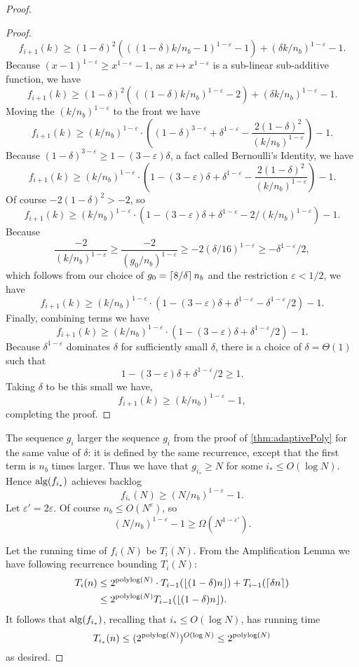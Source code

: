 \begin{proof}
\begin{proof}
  $$f_{i+1}(k) \ge (1-\delta)^2 (((1-\delta)k/n_b-1)^{1-\varepsilon}-1) + (\delta k/n_b)^{1-\varepsilon} - 1.$$
  Because $(x-1)^{1-\varepsilon} \ge x^{1-\varepsilon} -1$, as $x\mapsto x^{1-\varepsilon}$ is a sub-linear
  sub-additive function, we have 
  $$f_{i+1}(k) \ge (1-\delta)^2 (((1-\delta)k/n_b)^{1-\varepsilon}-2) + (\delta k/n_b)^{1-\varepsilon}-1.$$
  Moving the $(k/n_b)^{1-\varepsilon}$ to the front we have
  $$ f_{i+1}(k) \ge (k/n_b)^{1-\varepsilon} \cdot\left((1-\delta)^{3-\varepsilon} + \delta^{1-\varepsilon} - \frac{2(1-\delta)^2}{(k/n_b)^{1-\varepsilon}} \right) -1.$$
  Because $(1-\delta)^{3-\varepsilon} \ge 1-(3-\varepsilon)\delta$, a fact called Bernoulli's Identity, we have
  $$f_{i+1}(k) \ge (k/n_b)^{1-\varepsilon} \cdot\left(1-(3-\varepsilon)\delta + \delta^{1-\varepsilon} - \frac{2(1-\delta)^2}{(k/n_b)^{1-\varepsilon}} \right)-1.$$
  Of course $-2(1-\delta)^2 > -2$, so 
  $$f_{i+1}(k) \ge (k/n_b)^{1-\varepsilon} \cdot\left(1-(3-\varepsilon)\delta + \delta^{1-\varepsilon} - 2/(k/n_b)^{1-\varepsilon} \right) -1.$$
  Because $$\frac{-2}{(k/n_b)^{1-\varepsilon}} \ge \frac{-2}{(g_0/n_b)^{1-\varepsilon}} \ge -2(\delta/16)^{1-\varepsilon} \ge -\delta^{1-\varepsilon}/2,$$
  which follows from our choice of $g_0 = \left\lceil 8/\delta \right\rceil n_b$ and the restriction
  $\varepsilon<1/2$, we have 
  $$f_{i+1}(k) \ge (k/n_b)^{1-\varepsilon} \cdot\left(1-(3-\varepsilon)\delta + \delta^{1-\varepsilon} - \delta^{1-\varepsilon}/2 \right)-1.$$
  Finally, combining terms we have
  $$f_{i+1}(k) \ge  (k/n_b)^{1-\varepsilon} \cdot\left(1-(3-\varepsilon)\delta + \delta^{1-\varepsilon}/2\right)-1. $$
  Because $\delta^{1-\varepsilon}$ dominates $\delta$ for
  sufficiently small $\delta$, there is a choice of
  $\delta=\Theta(1)$ such that 
  $$1-(3-\varepsilon)\delta + \delta^{1-\varepsilon}/2 \ge 1.$$ 
  Taking $\delta$ to be this small we have,
  $$f_{i+1}(k) \ge (k/n_b)^{1-\varepsilon}-1,$$
  completing the proof. 
  \end{proof}

  The sequence $g_i$ larger the sequence $g_i$ from the proof of
  \cref{thm:adaptivePoly} for the same value of $\delta$: it is
  defined by the same recurrence, except that the first term is
  $n_b$ times larger. Thus we have that $g_{i_*} \ge N$ for some
  $i_* \le O(\log N)$. Hence $\operatorname{\text{\textup{alg}}}(f_{i_*})$ achieves backlog
  $$f_{i_*}(N) \ge (N/n_b)^{1-\varepsilon}-1.$$ Let $\varepsilon'
  = 2\varepsilon$. Of course $n_b \le O(N^\varepsilon)$, so 
  $$(N/n_b)^{1-\varepsilon}-1 \ge \Omega(N^{1-\varepsilon'}).$$

  Let the running time of $f_i(N)$ be $T_i(N)$. From the
  Amplification Lemma we have following recurrence bounding $T_i(N)$:
  \begin{align*}
    T_i(n) &\le 2^{\operatorname{\textnormal{polylog}}(N)} \cdot T_{i-1}(\left\lfloor (1-\delta)n \right\rfloor) + T_{i-1}(\left\lceil \delta n \right\rceil) \\
            &\le 2^{\operatorname{\textnormal{polylog}}(N)}T_{i-1}(\left\lfloor (1-\delta)n \right\rfloor).
  \end{align*}
  It follows that $\operatorname{\text{\textup{alg}}}(f_{i_*})$, recalling that $i_* \le O(\log N)$, has running time
  $$T_{i_*}(n) \le (2^{\operatorname{\textnormal{polylog}}(N)})^{O(\log N)} \le 2^{\operatorname{\textnormal{polylog}}(N)}$$
  as desired.


\end{proof}
